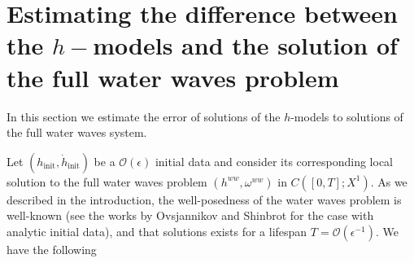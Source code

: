 \documentclass[11pt]{article}
\theoremstyle{plain}
\theoremstyle{definition}
\theoremstyle{definition}
\def\hinit{h_{\operatorname{init}}}
\def\htinit{{\dot h}_{\operatorname{init}}}
\begin{document}
\section{Estimating the difference between the $h-$models and the solution of the full water waves problem}\label{sec:error}
In this section we   estimate the error of solutions of the $h$-models to solutions of the full water waves system.

Let $(\hinit, \htinit)$ be a $\mathcal{O}(\epsilon)$ initial data and consider its corresponding local solution to the full water waves 
problem $(h^{ww},\omega^{ww})$ in $C([0,T];X^1)$. As we described in the introduction, the well-posedness of the  water waves problem is well-known (see the works by Ovsjannikov \cite{ovsjannikov1974shallow} and Shinbrot \cite{shinbrot1976initial} for the case with analytic initial data), and that solutions exists for a lifespan $T=\mathcal{O}(\epsilon^{-1})$. We have the following 
\end{document}
